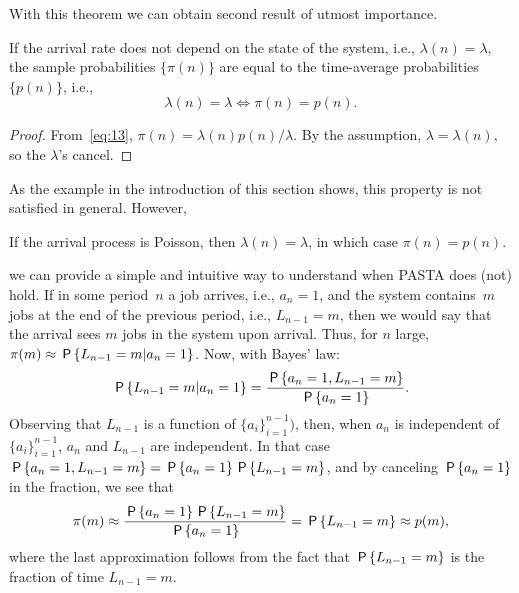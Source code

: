 \documentclass[stochastic-or.tex]{subfiles}
\begin{document}
With this theorem we can obtain second result of utmost importance.
\begin{theorem}
If the arrival rate does not depend on the state of the system, i.e., $\lambda(n)=\lambda$, the sample probabilities $\{\pi(n)\}$ are equal to the time-average probabilities $\{p(n)\}$, i.e.,
\begin{equation}\label{eq:pasta}
 \lambda(n) = \lambda \iff \pi(n) = p(n).
\end{equation}
\end{theorem}
\begin{proof}
From~\cref{eq:13}, $\pi(n) = \lambda(n) p(n)/\lambda$. By the assumption, $\lambda=\lambda(n)$, so the $\lambda$'s cancel.
\end{proof}


As the example in the introduction of this section shows, this property is not satisfied in general.
However,
\begin{corollary}
If the arrival process is Poisson, then $\lambda(n)=\lambda$, in which case $\pi(n)=p(n)$.
\end{corollary}



 we can provide a simple and intuitive way to understand when PASTA does (not) hold.
If in some period~$n$ a job arrives, i.e., $a_{n}=1$, and the system contains~$m$ jobs at the end of the previous period, i.e., $L_{n-1}=m$, then we would say that the arrival sees $m$ jobs in the system upon arrival.
Thus, for $n$ large, $\pi(m) \approx \P{L_{n-1}=m | a_n=1}$.
Now, with Bayes' law:
\begin{equation*}
\P{L_{n-1}=m | a_n=1} = \frac{\P{a_n=1, L_{n-1}=m}}{\P{a_n=1}}.
\end{equation*}
Observing that $L_{n-1}$ is a function of $\{a_i\}_{i=1}^{n-1})$, then, when $a_{n}$ is independent of $\{a_i\}_{i=1}^{n-1}$, $a_{n}$ and $L_{n-1}$ are independent.
In that case $\P{a_n=1, L_{n-1}=m} = \P{a_n=1} \P{L_{n-1}=m}$, and by canceling $\P{a_{n}=1}$ in the fraction, we see that
\begin{equation*}
\pi(m) \approx \frac{\P{a_n=1} \P{L_{n-1}=m}}{\P{a_n=1}} = \P{L_{n-1}=m} \approx p(m),
\end{equation*}
where the last approximation follows from the fact that $\P{L_{n-1}=m}$ is the fraction of time $L_{n-1}=m$.
\end{document}
